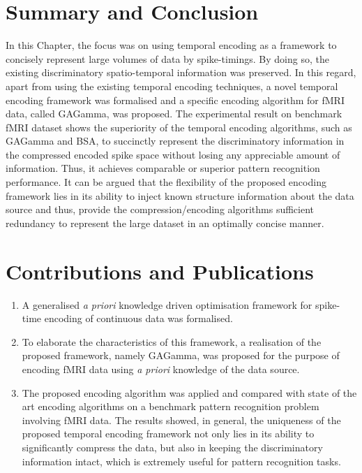 \section{Summary and Conclusion}
In this Chapter, the focus was on using temporal encoding as a framework to concisely represent large volumes of data by spike-timings. By doing so, the existing discriminatory spatio-temporal information was preserved. In this regard, apart from using the existing temporal encoding techniques, a novel temporal encoding framework was formalised and a specific encoding algorithm for fMRI data, called GAGamma, was proposed. The experimental result on benchmark fMRI dataset shows the superiority of the temporal encoding algorithms, such as GAGamma and BSA, to succinctly represent the discriminatory information in the compressed encoded spike space without losing any appreciable amount of information. Thus, it achieves comparable or superior pattern recognition performance. It can be argued that the flexibility of the proposed encoding framework lies in its ability to inject known structure information about the data source and thus, provide the compression/encoding algorithms sufficient redundancy to represent the large dataset in an optimally concise manner. 

\pagebreak
\section{Contributions and Publications}
\begin{tcolorbox}[colback=black!5,colframe=black!40!black,title=Contributions]
	\begin{enumerate}
		\item A generalised \emph{a priori} knowledge driven optimisation framework for spike-time encoding of continuous data was formalised.  
		\item To elaborate the characteristics of this framework, a realisation of the proposed framework, namely GAGamma, was proposed for the purpose of encoding fMRI data using \emph{a priori} knowledge of the data source.
		\item The proposed encoding algorithm was applied and compared with state of the art encoding algorithms on a benchmark pattern recognition problem involving fMRI data. The results showed, in general, the uniqueness of the proposed temporal encoding framework not only lies in its ability to significantly compress the data, but also in keeping the discriminatory information intact, which is extremely useful for pattern recognition tasks. 
	\end{enumerate}
	
\end{tcolorbox}

